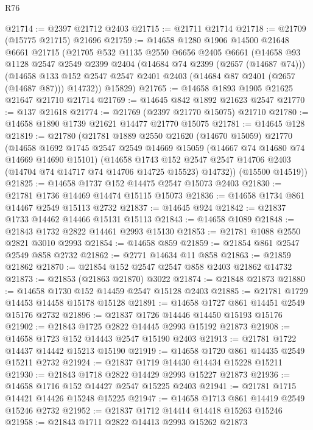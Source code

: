 \begin{lexlean}{R76}
\begin{coremodule}
@21714 := @2397 @21712 @2403
@21715 := @21711 @21714
@21718 := @21709 (@15775 @21715) @21696
@21759 := @14658
    @1280
    @1906
    @14500
    @21648
    @6661
    @21715
    (@21705
      @532
      @1135
      @2550
      @6656
      @2405
      @6661
      (@14658
        @93
        @1128
        @2547
        @2549
        @2399
        @2404
        (@14684 @74 @2399 (@2657 (@14687 @74)))
        (@14658 @133 @152 @2547 @2547 @2401 @2403 (@14684 @87 @2401 (@2657 (@14687 @87))) @14732))
      @15829)
@21765 := @14658 @1893 @1905 @21625 @21647 @21710 @21714
@21769 := @14645 @842 @1892 @21623 @2547
@21770 := @137 @21618
@21774 := @21769 (@2397 @21770 @15075) @21710
@21780 := @14658 @1890 @1739 @21621 @14477 @21770 @15075
@21781 := @14645 @128
@21819 := @21780
    (@21781
      @1889
      @2550
      @21620
      (@14670 @15059)
      @21770
      (@14658
        @1692
        @1745
        @2547
        @2549
        @14669
        @15059
        (@14667 @74 @14680 @74 @14669 @14690 @15101)
        (@14658
          @1743
          @152
          @2547
          @2547
          @14706
          @2403
          (@14704 @74 @14717 @74 @14706 @14725 @15523)
          @14732))
      (@15500 @14519))
@21825 := @14658 @1737 @152 @14475 @2547 @15073 @2403
@21830 := @21781 @1736 @14469 @14474 @15115 @15073
@21836 := @14658 @1734 @861 @14467 @2549 @15113 @2732
@21837 := @14645 @924
@21842 := @21837 @1733 @14462 @14466 @15131 @15113
@21843 := @14658 @1089
@21848 := @21843 @1732 @2822 @14461 @2993 @15130
@21853 := @21781 @1088 @2550 @2821 @3010 @2993
@21854 := @14658 @859
@21859 := @21854 @861 @2547 @2549 @858 @2732
@21862 := @2771 @14634 @11 @858
@21863 := @21859 @21862
@21870 := @21854 @152 @2547 @2547 @858 @2403 @21862 @14732
@21873 := @21853 (@21863 @21870) @3022
@21874 := @21848 @21873
@21880 := @14658 @1730 @152 @14459 @2547 @15128 @2403
@21885 := @21781 @1729 @14453 @14458 @15178 @15128
@21891 := @14658 @1727 @861 @14451 @2549 @15176 @2732
@21896 := @21837 @1726 @14446 @14450 @15193 @15176
@21902 := @21843 @1725 @2822 @14445 @2993 @15192 @21873
@21908 := @14658 @1723 @152 @14443 @2547 @15190 @2403
@21913 := @21781 @1722 @14437 @14442 @15213 @15190
@21919 := @14658 @1720 @861 @14435 @2549 @15211 @2732
@21924 := @21837 @1719 @14430 @14434 @15228 @15211
@21930 := @21843 @1718 @2822 @14429 @2993 @15227 @21873
@21936 := @14658 @1716 @152 @14427 @2547 @15225 @2403
@21941 := @21781 @1715 @14421 @14426 @15248 @15225
@21947 := @14658 @1713 @861 @14419 @2549 @15246 @2732
@21952 := @21837 @1712 @14414 @14418 @15263 @15246
@21958 := @21843 @1711 @2822 @14413 @2993 @15262 @21873

\end{coremodule}
\end{lexlean}
